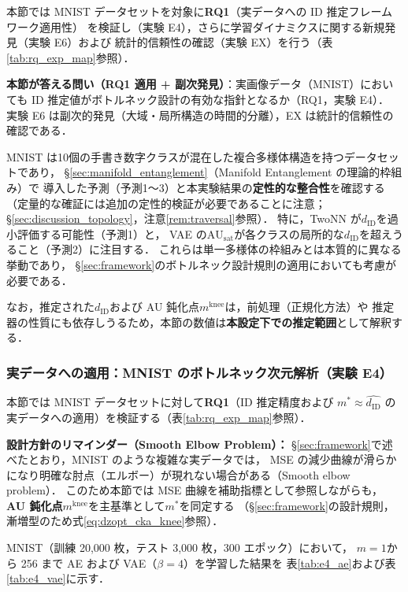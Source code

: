 \documentclass[12pt,a4paper]{jsarticle}
\newcommand{\dID}{d_{\mathrm{ID}}}
\newcommand{\dzopt}{m^*}                    %
\newcommand{\AUsat}{\mathrm{AU}_{\mathrm{sat}}}
\newcommand{\mknee}{m^{\mathrm{knee}}}      %
\begin{document}
本節では MNIST データセットを対象に\textbf{RQ1}（実データへの ID 推定フレームワーク適用性）
を検証し（実験 E4），さらに学習ダイナミクスに関する新規発見（実験 E6）および
統計的信頼性の確認（実験 EX）を行う（表\ref{tab:rq_exp_map}参照）．

\noindent\textbf{本節が答える問い（RQ1 適用 + 副次発見）}：実画像データ（MNIST）においても
ID 推定値がボトルネック設計の有効な指針となるか（RQ1，実験 E4）．
実験 E6 は副次的発見（大域・局所構造の時間的分離），EX は統計的信頼性の確認である．

MNIST は10個の手書き数字クラスが混在した複合多様体構造を持つデータセットであり，
§\ref{sec:manifold_entanglement}（Manifold Entanglement の理論的枠組み）で
導入した予測（予測1〜3）と本実験結果の\textbf{定性的な整合性}を確認する
（定量的な確証には追加の定性的検証が必要であることに注意；§\ref{sec:discussion_topology}，注意\ref{rem:traversal}参照）．
特に，TwoNN が$\dID$を過小評価する可能性（予測1）と，
VAE の$\AUsat$が各クラスの局所的な$\dID$を超えうること（予測2）に注目する．
これらは単一多様体の枠組みとは本質的に異なる挙動であり，
§\ref{sec:framework}のボトルネック設計規則の適用においても考慮が必要である．

なお，推定された$\dID$および AU 鈍化点$\mknee$は，前処理（正規化方法）や
推定器の性質にも依存しうるため，本節の数値は\textbf{本設定下での推定範囲}として解釈する．

\subsubsection{実データへの適用：MNIST のボトルネック次元解析（実験 E4）}

本節では MNIST データセットに対して\textbf{RQ1}（ID 推定精度および
$\dzopt \approx \hat{\dID}$ の実データへの適用）を検証する（表\ref{tab:rq_exp_map}参照）．

\textbf{設計方針のリマインダー（Smooth Elbow Problem）：}
§\ref{sec:framework}で述べたとおり，MNIST のような複雑な実データでは，
MSE の減少曲線が滑らかになり明確な肘点（エルボー）が現れない場合がある（Smooth elbow problem）．
このため本節では MSE 曲線を補助指標として参照しながらも，
\textbf{AU 鈍化点$\mknee$}を主基準として$\dzopt$を同定する
（§\ref{sec:framework}の設計規則，漸増型のため式\eqref{eq:dzopt_cka_knee}参照）．

MNIST（訓練 20{,}000 枚，テスト 3{,}000 枚，300 エポック）において，
$m = 1$から 256 まで AE および VAE（$\beta = 4$）を学習した結果を
表\ref{tab:e4_ae}および表\ref{tab:e4_vae}に示す．
\end{document}
